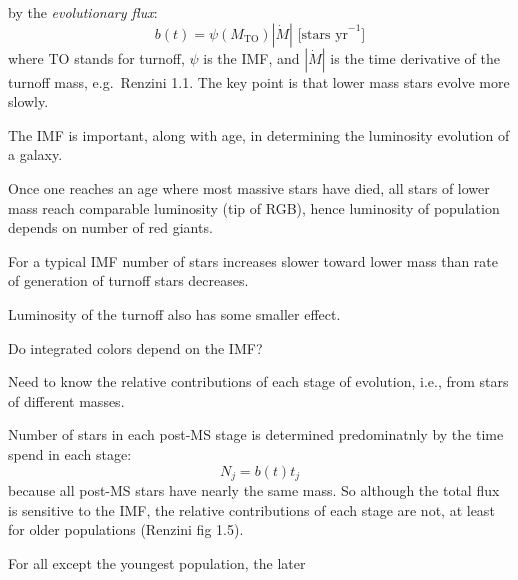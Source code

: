 \documentclass[12pt]{article}
\begin{document}
\begin{itemize*}
\begin{itemize*}
\begin{itemize*}
                            by the \emph{evolutionary flux}:
                            $$ b(t) = \psi(M_{\textrm{TO}})|\dot{M}|
                            \textrm{\ [stars\ yr}^{-1}]$$
                            where TO stands for turnoff, $\psi$ is the IMF,
                            and $|\dot{M}|$ is the time derivative of the
                            turnoff mass, e.g.\ Renzini 1.1. The key point is
                            that lower mass stars evolve more slowly.
                        \item The IMF is important, along with age, in
                            determining the luminosity evolution of a galaxy.
                        \item Once one reaches an age where most massive stars
                            have died, all stars of lower mass reach comparable
                            luminosity (tip of RGB), hence luminosity of
                            population depends on number of red giants.
                        \item For a typical IMF number of stars increases
                            slower toward lower mass than rate of generation
                            of turnoff stars decreases.
                        \item Luminosity of the turnoff also has some smaller
                            effect.
                    \end{itemize*}
                \item Do integrated colors depend on the IMF?
                    \begin{itemize*}
                        \item Need to know the relative contributions of each
                            stage of evolution, i.e., from stars of different
                            masses.
                        \item Number of stars in each post-MS stage is
                            determined predominatnly by the time spend in each
                            stage:
                            $$ N_j = b(t)t_j $$
                            because all post-MS stars have nearly the same mass.
                            So although the total flux is sensitive to the IMF,
                            the relative contributions of each stage are not,
                            at least for older populations (Renzini fig 1.5).
                        \item For all except the youngest population, the later

\end{itemize*}
\end{itemize*}
\end{itemize*}
\end{document}
